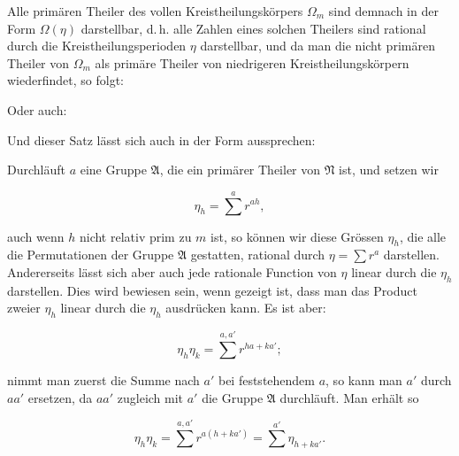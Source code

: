 
Alle primären Theiler des vollen Kreistheilungskörpers $\Omega_m$ sind demnach in der Form $\Omega(\eta)$ darstellbar, d.\,h. alle Zahlen eines solchen Theilers sind rational durch die Kreistheilungsperioden $\eta$ darstellbar, und da man die nicht primären Theiler von $\Omega_m$ als primäre Theiler von niedrigeren Kreistheilungskörpern wiederfindet, so folgt:


Oder auch:


Und dieser Satz lässt sich auch in der Form aussprechen:


Durchläuft $a$ eine Gruppe $\mathfrak{A}$, die ein primärer Theiler von $\mathfrak{N}$ ist, und setzen wir

\[
\eta_h = \sum^a r^{ah},
\]

auch wenn $h$ nicht relativ prim zu $m$ ist, so können wir diese Grössen $\eta_h$, die alle die Permutationen der Gruppe $\mathfrak{A}$ gestatten, rational durch $\eta = \sum r^a$ darstellen. Andererseits lässt sich aber auch jede rationale Function von $\eta$ linear durch die $\eta_h$ darstellen. Dies wird bewiesen sein, wenn gezeigt ist, dass man das Product zweier $\eta_h$ linear durch die $\eta_h$ ausdrücken kann. Es ist aber:

\[
\eta_h \eta_k = \sum^{a, a'} r^{ha + ka'};
\]

nimmt man zuerst die Summe nach $a'$ bei feststehendem $a$, so kann man $a'$ durch $aa'$ ersetzen, da $aa'$ zugleich mit $a'$ die Gruppe $\mathfrak{A}$ durchläuft. Man erhält so

\[
\eta_h \eta_k = \sum^{a, a'} r^{a(h + ka')} = \sum^{a'} \eta_{h + ka'}.
\]
